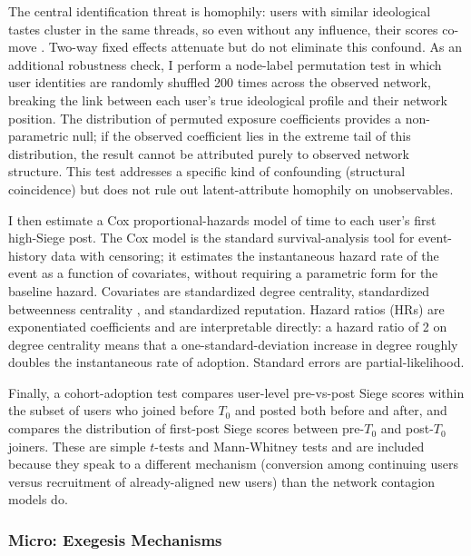 \documentclass[bibtex,autowc,nonblind]{apsr_submission}
\begin{document}
The central identification threat is homophily: users with similar ideological tastes cluster in the same threads, so even without any influence, their scores co-move \citep{shalizi2011homophily, aral2009distinguishing}. Two-way fixed effects attenuate but do not eliminate this confound. As an additional robustness check, I perform a node-label permutation test \citep{gonzalez2014assessing} in which user identities are randomly shuffled 200 times across the observed network, breaking the link between each user's true ideological profile and their network position. The distribution of permuted exposure coefficients provides a non-parametric null; if the observed coefficient lies in the extreme tail of this distribution, the result cannot be attributed purely to observed network structure. This test addresses a specific kind of confounding (structural coincidence) but does not rule out latent-attribute homophily on unobservables.

I then estimate a Cox proportional-hazards model \citep{cox1972regression, therneau2000cox, allison2014event} of time to each user's first high-Siege post. The Cox model is the standard survival-analysis tool for event-history data with censoring; it estimates the instantaneous hazard rate of the event as a function of covariates, without requiring a parametric form for the baseline hazard. Covariates are standardized degree centrality, standardized betweenness centrality \citep{freeman1977set}, and standardized reputation. Hazard ratios (HRs) are exponentiated coefficients and are interpretable directly: a hazard ratio of 2 on degree centrality means that a one-standard-deviation increase in degree roughly doubles the instantaneous rate of adoption. Standard errors are partial-likelihood.

Finally, a cohort-adoption test compares user-level pre-vs-post Siege scores within the subset of users who joined before $T_0$ and posted both before and after, and compares the distribution of first-post Siege scores between pre-$T_0$ and post-$T_0$ joiners. These are simple $t$-tests and Mann-Whitney tests and are included because they speak to a different mechanism (conversion among continuing users versus recruitment of already-aligned new users) than the network contagion models do.

\subsubsection{Micro: Exegesis Mechanisms}
\end{document}
